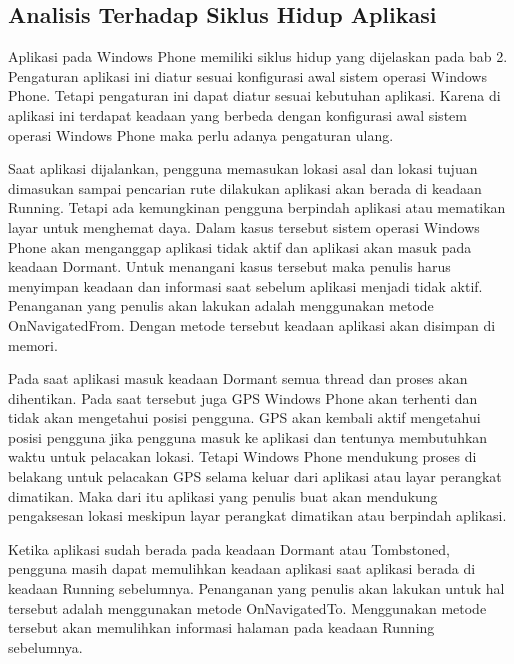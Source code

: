 \newpage
\subsection{Analisis Terhadap Siklus Hidup Aplikasi}
\label{lab:Analisis Terhadap Siklus Hidup Aplikasi}
\hspace{0.5cm} Aplikasi pada Windows Phone memiliki siklus hidup yang dijelaskan pada bab 2. Pengaturan aplikasi ini diatur sesuai konfigurasi awal sistem operasi Windows Phone. Tetapi pengaturan ini dapat diatur sesuai kebutuhan aplikasi. Karena di aplikasi ini terdapat keadaan yang berbeda dengan konfigurasi awal sistem operasi Windows Phone maka perlu adanya pengaturan ulang.

\hspace{0.5cm} Saat aplikasi dijalankan, pengguna memasukan lokasi asal dan lokasi tujuan dimasukan sampai pencarian rute dilakukan aplikasi akan berada di keadaan Running. Tetapi ada kemungkinan pengguna berpindah aplikasi atau mematikan layar untuk menghemat daya. Dalam kasus tersebut sistem operasi Windows Phone akan menganggap aplikasi tidak aktif dan aplikasi akan masuk pada keadaan Dormant. Untuk menangani kasus tersebut maka penulis harus menyimpan keadaan dan informasi saat sebelum aplikasi menjadi tidak aktif. Penanganan yang penulis akan lakukan adalah menggunakan metode OnNavigatedFrom. Dengan metode tersebut keadaan aplikasi akan disimpan di memori.

\hspace{0.5cm} Pada saat aplikasi masuk keadaan Dormant semua thread dan proses akan dihentikan. Pada saat tersebut juga GPS Windows Phone akan terhenti dan tidak akan mengetahui posisi pengguna. GPS akan kembali aktif mengetahui posisi pengguna jika pengguna masuk ke aplikasi dan tentunya membutuhkan waktu untuk pelacakan lokasi. Tetapi Windows Phone mendukung proses di belakang untuk pelacakan GPS selama keluar dari aplikasi atau layar perangkat dimatikan. Maka dari itu aplikasi yang penulis buat akan mendukung pengaksesan lokasi meskipun layar perangkat dimatikan atau berpindah aplikasi. 

\hspace{0.5cm} Ketika aplikasi sudah berada pada keadaan Dormant atau Tombstoned, pengguna masih dapat memulihkan keadaan aplikasi saat aplikasi berada di keadaan Running sebelumnya. Penanganan yang penulis akan lakukan untuk hal tersebut adalah menggunakan metode OnNavigatedTo. Menggunakan metode tersebut akan memulihkan informasi halaman pada keadaan Running sebelumnya.

